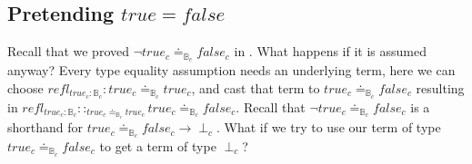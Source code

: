 \subsection{Pretending $true=false$}
 
Recall that we proved $\lnot true_{c}\doteq_{\mathbb{B}_{c}}false_{c}$ in .
What happens if it is assumed anyway?
Every type equality assumption needs an underlying term, here we can choose $refl_{true_{c}:\mathbb{B}_{c}}:true_{c}\doteq_{\mathbb{B}_{c}}true_{c}$, and cast that term to $true_{c}\doteq_{\mathbb{B}_{c}}false_{c}$ resulting in $refl_{true_{c}:\mathbb{B}_{c}}::_{true_{c}\doteq_{\mathbb{B}_{c}}true_{c}}true_{c}\doteq_{\mathbb{B}_{c}}false_{c}$.
Recall that $\lnot true_{c}\doteq_{\mathbb{B}_{c}}false_{c}$ is a shorthand for $true_{c}\doteq_{\mathbb{B}_{c}}false_{c}\rightarrow\perp_{c}$.
What if we try to use our term of type $true_{c}\doteq_{\mathbb{B}_{c}}false_{c}$ to get a term of type $\perp_{c}$?
 
